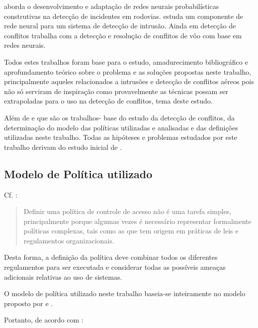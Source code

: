 \cite{jin_development_2002} aborda o desenvolvimento e adaptação de redes neurais probabilísticas construtivas na detecção de incidentes em rodovias. \cite{debar_neural_1992} estuda um componente de rede neural para um sistema de detecção de intrusão. Ainda em detecção de conflitos \cite{chen_flight_2011} trabalha com a detecção e resolução de conflitos de vôo com base em redes neurais.

Todos estes trabalhos foram base para o estudo, amadurecimento bibliográfico e aprofundamento teórico sobre o problema e as soluções propostas neste trabalho, principalmente aqueles relacionados a intrusões e detecção de conflitos aéreos pois não só serviram de inspiração como provavelmente as técnicas possam ser extrapoladas para o uso na detecção de conflitos, tema deste estudo.

Além de \cite{sarkis2017} e \cite{sarkis:artigo:2016} que são os trabalhos- base do estudo da detecção de conflitos, da determinação do modelo das políticas utilizadas e analisadas e das definições utilizadas neste trabalho. Todas as hipóteses e problemas estudados por este trabalho derivam do estudo inicial de \cite{sarkis2017}. 

\subsection{Modelo de Política utilizado}\label{modelo_politica_utilizada}
Cf. \cite{sarkis2017}:

\begin{quotation}
	Definir uma política de controle de acesso não é uma tarefa simples, principalmente porque algumas vezes é necessário representar formalmente políticas complexas, tais como as que tem origem em práticas de leis e regulamentos organizacionais.
\end{quotation} 

Desta forma, a definição da política deve combinar todos os diferentes regulamentos para ser executada e considerar todas as possíveis ameaças adicionais relativas ao uso de sistemas. \cite{di_vimercati_policies_2005}

O modelo de política utilizado neste trabalho baseia-se inteiramente no modelo proposto por \cite{sarkis2017} e \cite{sarkis:artigo:2016}.

Portanto, de acordo com \cite[p.36]{sarkis2017}:

